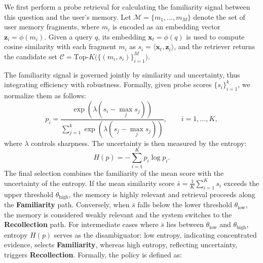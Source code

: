 We first perform a probe retrieval for calculating the familiarity signal between this question and the user's memory. Let $\mathcal{M}=\{m_1,\ldots,m_M\}$ denote the set of user memory fragments, where $m_i$ is encoded as an embedding vector $\mathbf{z}_i=\phi(m_i)$.  
Given a query $q$, its embedding $\mathbf{x}_t=\phi(q)$ is used to compute cosine similarity with each fragment $m_i$ as $s_i=\langle \mathbf{x}_t,\mathbf{z}_i\rangle$, and the retriever returns the candidate set  $\mathcal{C}=\text{Top-}K\big(\{(m_i,s_i)\}_{i=1}^M\big).$

The familiarity signal is governed jointly by similarity and uncertainty, thus integrating efficiency with robustness.  
Formally, given probe scores $\{s_i\}_{i=1}^k$, we normalize them as follows:
\begin{equation}
p_i = \frac{\exp(\lambda (s_i - \max_j s_j))}{\sum_{j=1}^k \exp(\lambda (s_j - \max_j s_j))}, \qquad i=1,\ldots,K , 
\end{equation}
where $\lambda$ controls sharpness. The uncertainty is then measured by the entropy:
\begin{equation}
H(p) = - \sum_{i=1}^K p_i \log p_i .
\end{equation}
The final selection combines the familiarity of the mean score with the uncertainty of the entropy. If the mean similarity score $\bar{s}=\frac{1}{K}\sum_{i=1}^K s_i$ exceeds the upper threshold $\theta_{\text{high}}$, the memory is highly relevant and retrieval proceeds along the \textbf{Familiarity} path. Conversely, when $\bar{s}$ falls below the lower threshold $\theta_{\text{low}}$, the memory is considered weakly relevant and the system switches to the \textbf{Recollection} path. For intermediate cases where $\bar{s}$ lies between $\theta_{\text{low}}$ and $\theta_{\text{high}}$, entropy $H(p)$ serves as the disambiguator: low entropy, indicating concentrated evidence, selects \textbf{Familiarity}, whereas high entropy, reflecting uncertainty, triggers \textbf{Recollection}. Formally, the policy is defined as:
